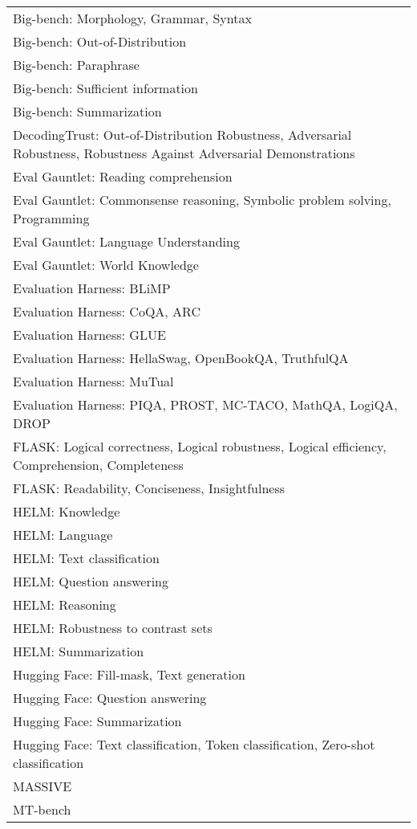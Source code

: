 \documentclass[fleqn]{article}
\begin{document}
\begin{table}[H]
\begin{tabular}{l}
		Big-bench: Morphology, Grammar, Syntax \\
		Big-bench: Out-of-Distribution \\
		Big-bench: Paraphrase \\
		Big-bench: Sufficient information \\
		Big-bench: Summarization \\
		DecodingTrust: Out-of-Distribution Robustness, Adversarial Robustness, 			Robustness Against Adversarial Demonstrations\\
		Eval Gauntlet: Reading comprehension \cite{evalgauntlet} \\
		Eval Gauntlet: Commonsense reasoning, Symbolic problem solving, Programming \\
		Eval Gauntlet: Language Understanding  \\
		Eval Gauntlet: World Knowledge \\
		Evaluation Harness: BLiMP \\
		Evaluation Harness: CoQA, ARC \\
		Evaluation Harness: GLUE \\
		Evaluation Harness: HellaSwag, OpenBookQA, TruthfulQA \\
		Evaluation Harness: MuTual \\
		Evaluation Harness: PIQA, PROST, MC-TACO, MathQA, LogiQA, DROP \\
		FLASK: Logical correctness, Logical robustness, Logical efficiency, Comprehension, Completeness \cite{flask}  \\
		FLASK: Readability, Conciseness, Insightfulness \\
		HELM: Knowledge \\
		HELM: Language \\
		HELM: Text classification \\
		HELM: Question answering \\
		HELM: Reasoning \\
		HELM: Robustness to contrast sets \\
		HELM: Summarization \\
		Hugging Face: Fill-mask, Text generation \cite{huggingface} \\
		Hugging Face: Question answering \\
		Hugging Face: Summarization \\
		Hugging Face: Text classification, Token classification, Zero-shot classification \\
		MASSIVE \cite{massive} \\
		MT-bench \\
		\bottomrule
	\end{tabular}	
\end{table}
\end{document}
